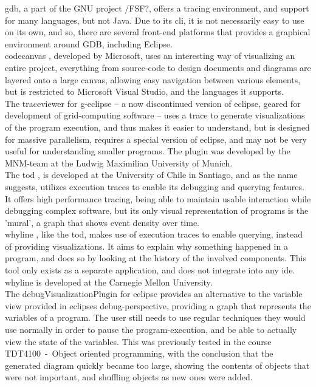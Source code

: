\gls{gdb}, a part of the GNU project /FSF?,  offers a tracing environment, and support for many languages, but not Java.
Due to its \gls{cli}, it is not necessarily easy to use on its own, and so, there are several front-end platforms that provides a graphical environment around GDB, including Eclipse.
~\\

\Gls{codecanvas} \cite{Deline2010}, developed by Microsoft, uses an interesting way of visualizing an entire project, everything from source-code to design documents and diagrams are layered onto a large canvas, allowing easy navigation between various elements, but is restricted to Microsoft Visual Studio, and the languages it supports.
~\\

The \gls{traceviewer} \cite{Kranzlmuller} for g-eclipse -- a now discontinued version of eclipse, geared for development of grid-computing software -- uses a trace to generate visualizations of the program execution, and thus makes it easier to understand, but is designed for massive parallelism, requires a special version of eclipse, and may not be very useful for understanding smaller programs.
The plugin was developed by the MNM-team at the Ludwig Maximilian University of Munich.
~\\

The \gls{tod} \cite{Pothier2007}, is developed at the University of Chile in Santiago, and as the name suggests, utilizes execution traces to enable its debugging and querying features.
It offers  high performance tracing, being able to maintain usable interaction while debugging complex software, but its only visual representation of programs is the 'mural', a graph that shows event density over time.
~\\

\Gls{whyline} \cite{ko2009}, like the \gls{tod}, makes use of execution traces to enable querying, instead of providing visualizations.
It aims to explain why something happened in a program, and does so by looking at the history of the involved components.
This tool only exists as a separate application, and does not integrate into any \gls{ide}.
\Gls{whyline} is developed at the Carnegie Mellon University.
~\\

The \gls{debugVisualizationPlugin} for eclipse provides an alternative to the variable view provided in eclipses debug-perspective, providing a graph that represents the variables of a program.
The user still needs to use regular techniques they would use normally in order to pause the program-execution, and be able to actually view the state of the variables.
This was previously tested in the course TDT4100~-~Object oriented programming, with the conclusion that the generated diagram quickly became too large, showing the contents of objects that were not important, and shuffling objects as new ones were added.%
~\\

